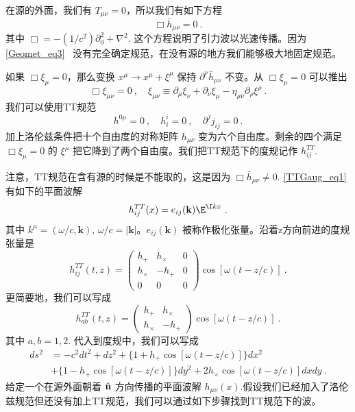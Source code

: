 
\begin{issues}
\issueNeedCite
\issueMissDepend
\end{issues}

在源的外面，我们有 $T_{\mu\nu} = 0$，所以我们有如下方程
\begin{equation}\label{TTGaug_eq1}
\Box \bar h_{\mu\nu} = 0 ~.
\end{equation}
其中 $\Box = - (1/c^2) \partial_0^2 +\nabla^2$. 这个方程说明了引力波以光速传播。因为\autoref{Geomet_eq3}~ 没有完全确定规范，在没有源的地方我们能够极大地固定规范。

如果 $\Box \xi_\mu = 0$，那么变换 $x^\mu \rightarrow x^\mu+\xi^\mu$ 保持 $\partial^\nu \bar h_{\mu\nu}$ 不变。从 $\Box \xi_\mu = 0$ 可以推出
\begin{equation}
\Box \xi_{\mu\nu} = 0~, \quad \xi_{\mu\nu} \equiv \partial_{\mu} \xi_\nu +\partial_\nu \xi_\mu - \eta_{\mu\nu} \partial_\rho\xi^\rho~. 
\end{equation}
我们可以使用TT规范
\begin{equation}
h^{0\mu} = 0~, \quad h^i_i = 0~, \quad \partial^j j_{ij} = 0~.
\end{equation}
加上洛伦兹条件把十个自由度的对称矩阵 $h_{\mu\nu}$ 变为六个自由度。剩余的四个满足 $\Box \xi_\mu = 0$ 的 $\xi^\mu$ 把它降到了两个自由度。我们把TT规范下的度规记作 $h_{ij}^{TT}$. 

注意，TT规范在含有源的时候是不能取的，这是因为 $\Box \bar h_{\mu\nu} \neq 0$. \autoref{TTGaug_eq1} 有如下的平面波解
\begin{equation}
h_{ij}^{TT} (x) = e_{ij} (\mathbf k) \E^{\I kx} ~.  
\end{equation}
其中 $k^\mu = (\omega/c,\mathbf k)$, $\omega/c = |\mathbf k|$。$e_{ij}(\mathbf k)$ 被称作极化张量。沿着z方向前进的度规张量是
\begin{equation}
h_{ij}^{TT} (t,z) = 
\begin{pmatrix}
h_+ & h_\times & 0 \\
h_\times & - h_+ & 0 \\
0 & 0 & 0
\end{pmatrix} \cos [\omega (t - z/c)]~. 
\end{equation}
更简要地，我们可以写成
\begin{equation}\label{TTGaug_eq2}
h_{ab}^{TT} (t,z) = 
\begin{pmatrix}
h_+ & h_\times   \\
h_\times & - h_+   
\end{pmatrix} \cos [\omega (t - z/c)]~. 
\end{equation}
其中 $a,b = 1,2$. 代入到度规中，我们可以写成
\begin{equation}
\begin{aligned}
ds^2 & = - c^2 dt^2 + dz^2 + \{ 1+ h_+ \cos [\omega(t-z/c)] \} dx^2 \\
& + \{ 1-h_+ \cos [\omega(t-z/c)] \} dy^2 + 2 h_\times \cos[\omega(t-z/c)] dx dy~.
\end{aligned}
\end{equation}
给定一个在源外面朝着 $\hat{\bf{n}}$ 方向传播的平面波解 $h_{\mu\nu}(x)$.假设我们已经加入了洛伦兹规范但还没有加上TT规范，我们可以通过如下步骤找到TT规范下的波。

